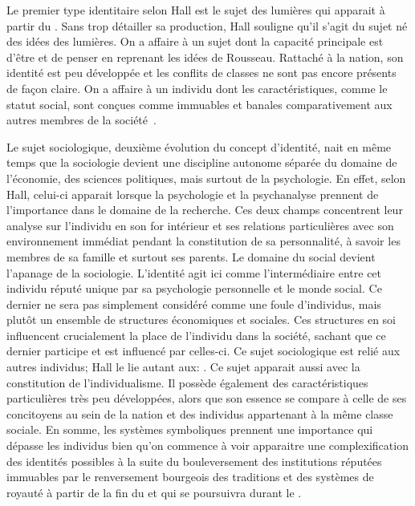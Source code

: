 Le premier type identitaire selon Hall est le sujet des lumières qui apparait à partir du .
Sans trop détailler sa production, Hall souligne qu'il s'agit du sujet né des idées des lumières.
On a affaire à un sujet dont la capacité principale est d'être et de penser en reprenant les idées de Rousseau.
Rattaché à la nation, son identité est peu développée et les conflits de classes ne sont pas encore présents de façon claire.
On a affaire à un individu dont les caractéristiques, comme le statut social, sont conçues comme immuables et banales comparativement aux autres membres de la société~\citeyearpar[596]{Hall1996a}.

Le sujet sociologique, deuxième évolution du concept d'identité, nait en même temps que la sociologie devient une discipline autonome séparée du domaine de l'économie, des sciences politiques, mais surtout de la psychologie.
En effet, selon Hall, celui-ci apparait lorsque la psychologie et la psychanalyse prennent de l'importance dans le domaine de la recherche.
Ces deux champs concentrent leur analyse sur l'individu en son for intérieur et ses relations particulières avec son environnement immédiat pendant la constitution de sa personnalité, à savoir les membres de sa famille et surtout ses parents.
Le domaine du social devient l'apanage de la sociologie.
L'identité agit ici comme l'intermédiaire entre cet individu réputé unique par sa psychologie personnelle et le monde social.
Ce dernier ne sera pas simplement considéré comme une foule d'individus, mais plutôt un ensemble de structures économiques et sociales.
Ces structures en soi influencent crucialement la place de l'individu dans la société, sachant que ce dernier participe et est influencé par celles-ci.
Ce sujet sociologique est relié aux autres individus; Hall le lie autant aux: .
Ce sujet apparait aussi avec la constitution de l'individualisme.
Il possède également des caractéristiques particulières très peu développées, alors que son essence se compare à celle de ses concitoyens au sein de la nation et des individus appartenant à la même classe sociale.
En somme, les systèmes symboliques prennent une importance qui dépasse les individus bien qu'on commence à voir apparaitre une complexification des identités possibles à la suite du bouleversement des institutions réputées immuables par le renversement bourgeois des traditions et des systèmes de royauté à partir de la fin du  et qui se poursuivra durant le .


